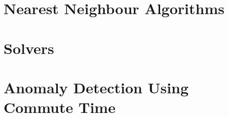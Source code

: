 \section{Nearest Neighbour Algorithms}
\label{nearestNeighbourAlgorithms}


\section{Solvers}
\label{solvers}


\section{Anomaly Detection Using Commute Time}
\label{anomalyDetection:commuteTime}
